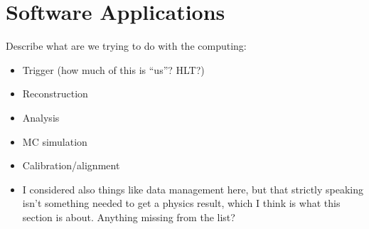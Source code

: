 \section{Software Applications} 
Describe what are we trying to do with the computing:
\begin{itemize}

\item Trigger (how much of this is ``us''?  HLT?)


\item Reconstruction

\item Analysis

\item MC simulation

\item Calibration/alignment

\item I considered also things like data management here, but that strictly speaking isn't something needed to get a physics result, which I think is what this section is about.  Anything missing from the list?
\end{itemize}


